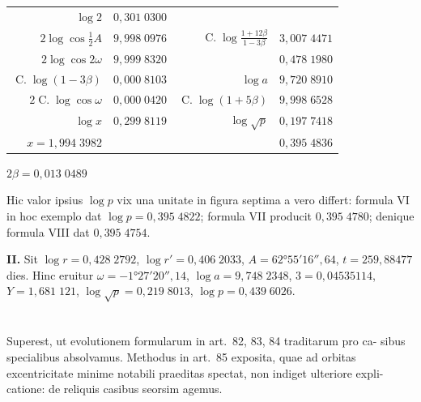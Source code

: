 \documentclass[12pt,a4paper]{article}
\newcommand{\C}{\mathop{\mathrm{C.}}\nolimits}
\begin{document}
\begin{center}
\begin{tabular}{@{}r@{\quad}l@{\qquad}r@{\quad}l@{}}
$\log 2$ & $0{,}301\;0300$ & & \\
$2\log\cos\tfrac{1}{2}A$ & $9{,}998\;0976$ & $\C\log\tfrac{1 + 12\beta}{1 - 3\beta}$ & $3{,}007\;4471$ \\
$2\log\cos 2\omega$ & $9{,}999\;8320$ & & $0{,}478\;1980$ \\
$\C\log(1 - 3\beta)$ & $0{,}000\;8103$ & $\log a$ & $9{,}720\;8910$ \\
$2\C\log\cos\omega$ & $0{,}000\;0420$ & $\C\log(1 + 5\beta)$ & $9{,}998\;6528$ \\ \hline
$\log x$ & $0{,}299\;8119$ & $\log\surd p$ & $0{,}197\;7418$ \\
$x = 1{,}994\;3982$ & & & $0{,}395\;4836$
\end{tabular}
\end{center}

\begin{center}
$2\beta = 0{,}013\;0489$
\end{center}

Hic valor ipsius $\log p$ vix una unitate in figura septima a vero differt: formula
VI in hoc exemplo dat $\log p = 0{,}395\;4822$; formula VII producit $0{,}395\;4780$;
denique formula VIII dat $0{,}395\;4754$.

\textbf{II.} Sit $\log r = 0{,}428\;2792$, $\log r' = 0{,}406\;2033$, $A = 62°55'16'',64$, $t =
259{,}88477$ dies. Hinc eruitur $\omega = -1°27'20'',14$, $\log a = 9{,}748\;2348$, $3 =
0{,}04535114$, $Y = 1{,}681\;121$, $\log\surd p = 0{,}219\;8013$, $\log p = 0{,}439\;6026$.

\section{}

Superest, ut evolutionem formularum in art.~82, 83, 84 traditarum pro ca-
sibus specialibus absolvamus. Methodus in art.~85 exposita, quae ad orbitas
excentricitate minime notabili praeditas spectat, non indiget ulteriore expli-
catione: de reliquis casibus seorsim agemus.
\end{document}
